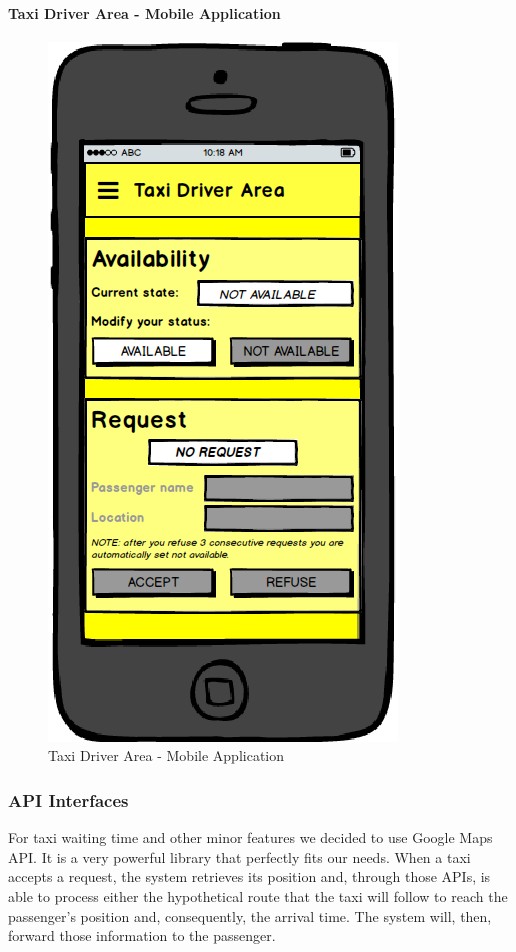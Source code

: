 		\paragraph{Taxi Driver Area - Mobile Application}
		\begin{figure}[!h]
			\begin{center}
				\includegraphics[scale=0.5]{../SE2_MOCKUPS/MobileAppTaxiDriverArea.png}
				\caption{Taxi Driver Area - Mobile Application}	
			\end{center}
		\end{figure}
		\newpage
		\subsubsection{API Interfaces}
			For taxi waiting time and other minor features we decided to use Google Maps API.
			It is a very powerful library that perfectly fits our needs.
			When a taxi accepts a request, the system retrieves its position and, through
			those APIs, is able to process either the hypothetical route that the taxi will
			follow to reach the passenger's position and, consequently, the arrival time.
			The system will, then, forward those information to the passenger.
